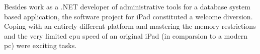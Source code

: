 

Besides work as a .NET developer of administrative tools for a database system based application, 
the software project \Nyaya for iPad constituted a welcome diversion.
Coping with an entirely different platform and mastering 
the memory restrictions and the very limited cpu speed of an original iPad 
(in comparsion to a modern pc) were exciting tasks. 


